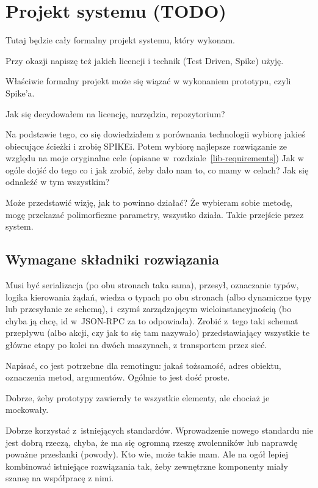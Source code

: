\chapter{Projekt systemu (TODO)}
Tutaj będzie cały formalny projekt systemu, który wykonam.

Przy okazji napiszę też jakich licencji i technik (Test Driven, Spike) użyję.

Właściwie formalny projekt może się wiązać w wykonaniem prototypu, czyli Spike'a. 

Jak się decydowałem na licencję, narzędzia, repozytorium?

Na podstawie tego, co się dowiedziałem z porównania technologii wybiorę jakieś obiecujące ścieżki i zrobię SPIKEi. Potem wybiorę najlepsze rozwiązanie ze względu na moje oryginalne cele (opisane w~rozdziale~\ref{lib-requirements})
Jak w ogóle dojść do tego  co i jak zrobić, żeby dało nam to, co mamy w celach? Jak się odnaleźć w tym wszystkim?

Może przedstawić wizję, jak to powinno działać? Że wybieram sobie metodę, mogę przekazać polimorficzne parametry, wszystko działa. Takie przejście przez system.


\section{Wymagane składniki rozwiązania}
Musi być serializacja (po obu stronach taka sama), przesył, oznaczanie typów, logika kierowania żądań, wiedza o typach po obu stronach (albo dynamiczne typy lub przesyłanie ze schemą), i~czymś zarządzającym wieloinstancyjnością (bo chyba ją chcę, id w~JSON-RPC za to odpowiada).
Zrobić z~tego taki schemat przepływu (albo akcji, czy jak to się tam nazywało) przedstawiający wszystkie te główne etapy po kolei na dwóch maszynach, z transportem przez sieć.

Napisać, co jest potrzebne dla remotingu: jakaś tożsamość, adres obiektu, oznaczenia metod, argumentów. Ogólnie to jest dość proste.

Dobrze, żeby prototypy zawierały te wszystkie elementy, ale chociaż je mockowały.

Dobrze korzystać z~istniejących standardów. Wprowadzenie nowego standardu nie jest dobrą rzeczą, chyba, że ma się ogromną rzeszę zwolenników lub naprawdę poważne przesłanki (powody). Kto wie, może takie mam. Ale na ogół lepiej kombinować istniejące rozwiązania tak, żeby zewnętrzne komponenty miały szansę na współpracę z nimi.



